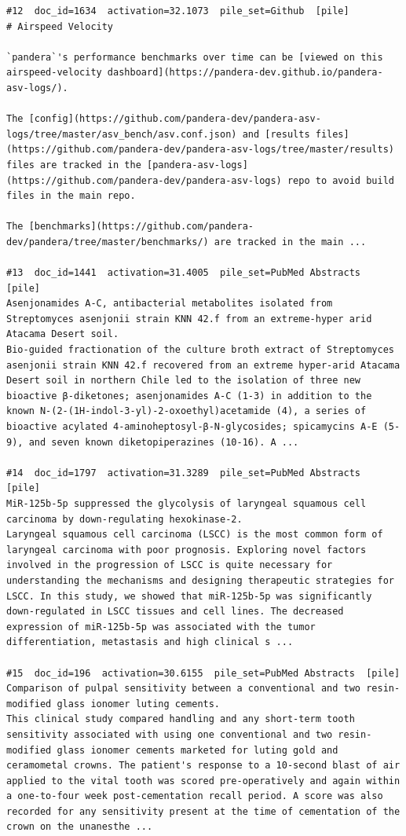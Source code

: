 \begin{verbatim}
#12  doc_id=1634  activation=32.1073  pile_set=Github  [pile]
# Airspeed Velocity 

`pandera`'s performance benchmarks over time can be [viewed on this airspeed-velocity dashboard](https://pandera-dev.github.io/pandera-asv-logs/).

The [config](https://github.com/pandera-dev/pandera-asv-logs/tree/master/asv_bench/asv.conf.json) and [results files](https://github.com/pandera-dev/pandera-asv-logs/tree/master/results) files are tracked in the [pandera-asv-logs](https://github.com/pandera-dev/pandera-asv-logs) repo to avoid build files in the main repo.

The [benchmarks](https://github.com/pandera-dev/pandera/tree/master/benchmarks/) are tracked in the main ...

#13  doc_id=1441  activation=31.4005  pile_set=PubMed Abstracts  [pile]
Asenjonamides A-C, antibacterial metabolites isolated from Streptomyces asenjonii strain KNN 42.f from an extreme-hyper arid Atacama Desert soil.
Bio-guided fractionation of the culture broth extract of Streptomyces asenjonii strain KNN 42.f recovered from an extreme hyper-arid Atacama Desert soil in northern Chile led to the isolation of three new bioactive β-diketones; asenjonamides A-C (1-3) in addition to the known N-(2-(1H-indol-3-yl)-2-oxoethyl)acetamide (4), a series of bioactive acylated 4-aminoheptosyl-β-N-glycosides; spicamycins A-E (5-9), and seven known diketopiperazines (10-16). A ...

#14  doc_id=1797  activation=31.3289  pile_set=PubMed Abstracts  [pile]
MiR-125b-5p suppressed the glycolysis of laryngeal squamous cell carcinoma by down-regulating hexokinase-2.
Laryngeal squamous cell carcinoma (LSCC) is the most common form of laryngeal carcinoma with poor prognosis. Exploring novel factors involved in the progression of LSCC is quite necessary for understanding the mechanisms and designing therapeutic strategies for LSCC. In this study, we showed that miR-125b-5p was significantly down-regulated in LSCC tissues and cell lines. The decreased expression of miR-125b-5p was associated with the tumor differentiation, metastasis and high clinical s ...

#15  doc_id=196  activation=30.6155  pile_set=PubMed Abstracts  [pile]
Comparison of pulpal sensitivity between a conventional and two resin-modified glass ionomer luting cements.
This clinical study compared handling and any short-term tooth sensitivity associated with using one conventional and two resin-modified glass ionomer cements marketed for luting gold and ceramometal crowns. The patient's response to a 10-second blast of air applied to the vital tooth was scored pre-operatively and again within a one-to-four week post-cementation recall period. A score was also recorded for any sensitivity present at the time of cementation of the crown on the unanesthe ...


\end{verbatim}

